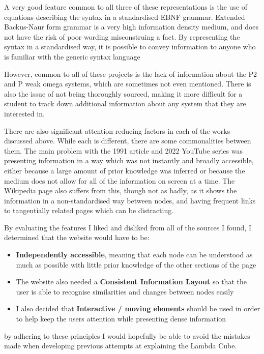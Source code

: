 \documentclass{l4proj}
\begin{document}
A very good feature common to all three of these representations is the use of equations describing the syntax in a standardised EBNF grammar.  Extended Backus-Naur form grammar is a very high information density medium, and does not have the risk of poor wording misconstruing a fact.  By representing the syntax in a standardised way, it is possible to convey information to anyone who is familiar with the generic syntax language

However, common to all of these projects is the lack of information about the P2 and P weak omega systems, which are sometimes not even mentioned.  There is also the issue of not being thoroughly sourced, making it more difficult for a student to track down additional information about any system that they are interested in.

There are also significant attention reducing factors in each of the works discussed above.  While each is different, there are some commonalities between them.  The main problem with the 1991 article and 2022 YouTube series was presenting information in a way which was not instantly and broadly accessible, either because a large amount of prior knowledge was inferred or because the medium does not allow for all of the information on screen at a time.  The Wikipedia page also suffers from this, though not as badly, as it shows the information in a non-standardised way between nodes, and having frequent links to tangentially related pages which can be distracting.

By evaluating the features I liked and disliked from all of the sources I found, I determined that the website would have to be:

\begin{itemize}
    \item \textbf{Independently accessible}, meaning that each node can be understood as much as possible with little prior knowledge of the other sections of the page

    \item The website also needed a \textbf{Consistent Information Layout} so that the user is able to recognise similarities and changes between nodes easily

    \item I also decided that \textbf{Interactive / moving elements} should be used in order to help keep the users attention while presenting dense information
\end{itemize}

by adhering to these principles I would hopefully be able to avoid the mistakes made when developing previous attempts at explaining the Lambda Cube.
\end{document}
